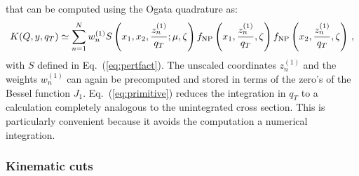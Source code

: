 \documentclass[10pt,a4paper]{article}
\begin{document}
that can be computed using the Ogata quadrature as:
\begin{equation}
  K(Q,y,q_T) \simeq \sum_{n=1}^N w_n^{(1)} S\left(x_1,x_2,\frac{z_n^{(1)}}{q_T};\mu,\zeta\right) f_{\rm NP}\left(x_1,\frac{z_n^{(1)}}{q_T},\zeta\right) f_{\rm NP}\left(x_2,\frac{z_n^{(1)}}{q_T},\zeta\right)\,,
\end{equation}
with $S$ defined in Eq.~(\ref{eq:pertfact}). The unscaled coordinates
$z_n^{(1)}$ and the weights $w_n^{(1)}$ can again be precomputed and
stored in terms of the zero's of the Bessel function
$J_1$. Eq.~(\ref{eq:primitive}) reduces the integration in $q_T$ to a
calculation completely analogous to the unintegrated cross
section. This is particularly convenient because it avoids the
computation a numerical integration.

\subsubsection{Kinematic cuts}\label{sec:kincuts}
\end{document}

